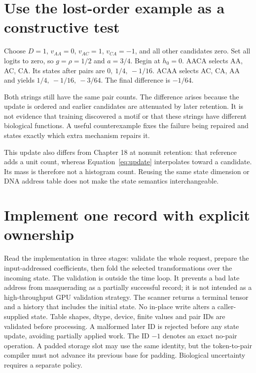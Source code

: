 \section{Use the lost-order example as a constructive test}
Choose $D=1$, $v_{AA}=0$, $v_{AC}=1$, $v_{CA}=-1$, and all other candidates
zero. Set all logits to zero, so $g=\rho=1/2$ and $a=3/4$. Begin at $h_0=0$.
AACA selects AA, AC, CA. Its states after pairs are
$0,\ 1/4,\ -1/16$. ACAA selects AC, CA, AA and yields
$1/4,\ -1/16,\ -3/64$. The final difference is $-1/64$.

\begin{center}\end{center}
Both strings still have the same pair counts. The difference arises because
the update is ordered and earlier candidates are attenuated by later retention.
It is not evidence that training discovered a motif or that these strings
have different biological functions. A useful counterexample fixes the failure
being repaired and states exactly which extra mechanism repairs it.


This update also differs from Chapter 18 at nonunit retention: that reference
adds a unit count, whereas Equation~\ref{eq:update} interpolates toward a
candidate. Its mass is therefore not a histogram count. Reusing the same state
dimension or DNA address table does not make the state semantics interchangeable.

\section{Implement one record with explicit ownership}
Read the implementation in three stages: validate the whole request, prepare
the input-addressed coefficients, then fold the selected transformations over
the incoming state. The validation is outside the time loop. It prevents a
bad late address from masquerading as a partially successful record; it is
not intended as a high-throughput GPU validation strategy.
The scanner returns a terminal tensor and a history that includes the initial
state. No in-place write alters a caller-supplied state. Table shapes, dtype,
device, finite values and pair IDs are validated before processing. A malformed
later ID is rejected before any state update, avoiding partially applied work.
The ID $-1$ denotes an exact no-pair operation. A padded storage slot may use
the same identity, but the token-to-pair compiler must not advance its previous
base for padding. Biological uncertainty requires a separate policy.

